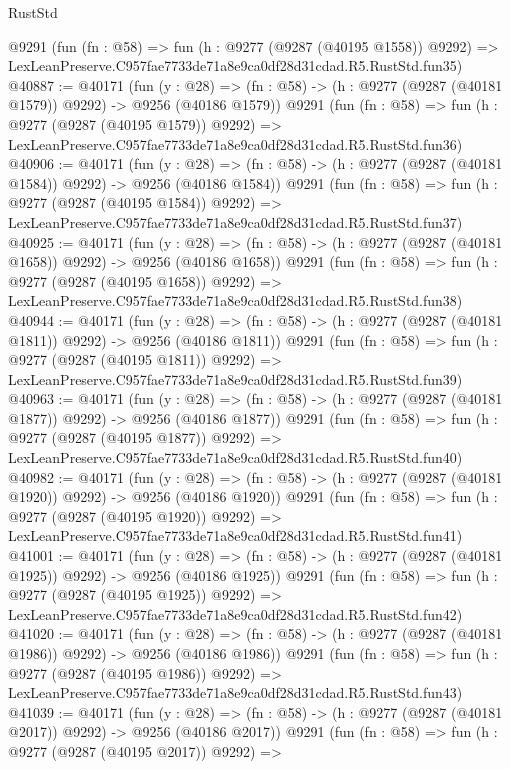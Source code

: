 \begin{lexlean}{RustStd}
\begin{coremodule}
    @9291
    (fun (fn : @58) =>
    fun (h : @9277 (@9287 (@40195 @1558)) @9292) =>
    LexLeanPreserve.C957fae7733de71a8e9ca0df28d31cdad.R5.RustStd.fun35)
@40887 := @40171
    (fun (y : @28) =>
    (fn : @58) -> (h : @9277 (@9287 (@40181 @1579)) @9292) -> @9256 (@40186 @1579))
    @9291
    (fun (fn : @58) =>
    fun (h : @9277 (@9287 (@40195 @1579)) @9292) =>
    LexLeanPreserve.C957fae7733de71a8e9ca0df28d31cdad.R5.RustStd.fun36)
@40906 := @40171
    (fun (y : @28) =>
    (fn : @58) -> (h : @9277 (@9287 (@40181 @1584)) @9292) -> @9256 (@40186 @1584))
    @9291
    (fun (fn : @58) =>
    fun (h : @9277 (@9287 (@40195 @1584)) @9292) =>
    LexLeanPreserve.C957fae7733de71a8e9ca0df28d31cdad.R5.RustStd.fun37)
@40925 := @40171
    (fun (y : @28) =>
    (fn : @58) -> (h : @9277 (@9287 (@40181 @1658)) @9292) -> @9256 (@40186 @1658))
    @9291
    (fun (fn : @58) =>
    fun (h : @9277 (@9287 (@40195 @1658)) @9292) =>
    LexLeanPreserve.C957fae7733de71a8e9ca0df28d31cdad.R5.RustStd.fun38)
@40944 := @40171
    (fun (y : @28) =>
    (fn : @58) -> (h : @9277 (@9287 (@40181 @1811)) @9292) -> @9256 (@40186 @1811))
    @9291
    (fun (fn : @58) =>
    fun (h : @9277 (@9287 (@40195 @1811)) @9292) =>
    LexLeanPreserve.C957fae7733de71a8e9ca0df28d31cdad.R5.RustStd.fun39)
@40963 := @40171
    (fun (y : @28) =>
    (fn : @58) -> (h : @9277 (@9287 (@40181 @1877)) @9292) -> @9256 (@40186 @1877))
    @9291
    (fun (fn : @58) =>
    fun (h : @9277 (@9287 (@40195 @1877)) @9292) =>
    LexLeanPreserve.C957fae7733de71a8e9ca0df28d31cdad.R5.RustStd.fun40)
@40982 := @40171
    (fun (y : @28) =>
    (fn : @58) -> (h : @9277 (@9287 (@40181 @1920)) @9292) -> @9256 (@40186 @1920))
    @9291
    (fun (fn : @58) =>
    fun (h : @9277 (@9287 (@40195 @1920)) @9292) =>
    LexLeanPreserve.C957fae7733de71a8e9ca0df28d31cdad.R5.RustStd.fun41)
@41001 := @40171
    (fun (y : @28) =>
    (fn : @58) -> (h : @9277 (@9287 (@40181 @1925)) @9292) -> @9256 (@40186 @1925))
    @9291
    (fun (fn : @58) =>
    fun (h : @9277 (@9287 (@40195 @1925)) @9292) =>
    LexLeanPreserve.C957fae7733de71a8e9ca0df28d31cdad.R5.RustStd.fun42)
@41020 := @40171
    (fun (y : @28) =>
    (fn : @58) -> (h : @9277 (@9287 (@40181 @1986)) @9292) -> @9256 (@40186 @1986))
    @9291
    (fun (fn : @58) =>
    fun (h : @9277 (@9287 (@40195 @1986)) @9292) =>
    LexLeanPreserve.C957fae7733de71a8e9ca0df28d31cdad.R5.RustStd.fun43)
@41039 := @40171
    (fun (y : @28) =>
    (fn : @58) -> (h : @9277 (@9287 (@40181 @2017)) @9292) -> @9256 (@40186 @2017))
    @9291
    (fun (fn : @58) =>
    fun (h : @9277 (@9287 (@40195 @2017)) @9292) =>

\end{coremodule}
\end{lexlean}
